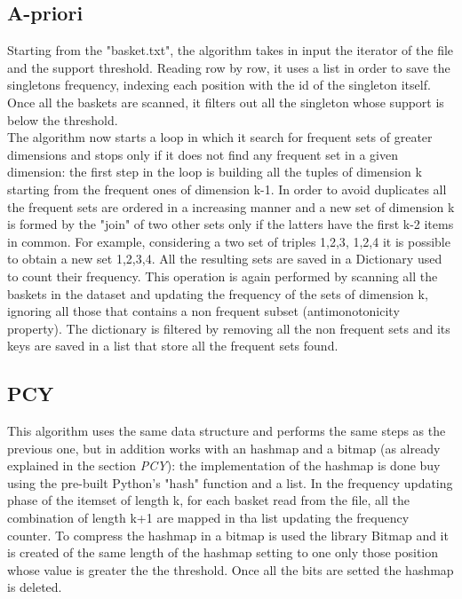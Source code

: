 \documentclass[14pt]{extarticle}
\begin{document}
\subsection{A-priori}
Starting from the "basket.txt", the algorithm takes in input the iterator of the file and the support threshold. Reading row by row, it uses a list in order to save the singletons frequency, indexing each position with the id of the singleton itself. Once all the baskets are scanned, it filters out all the singleton whose support is below the threshold.\\
The algorithm now starts a loop in which it search for frequent sets of greater dimensions and stops only if it does not find any frequent set in a given dimension:
the first step in the loop is building all the tuples of dimension k starting from the frequent ones of dimension k-1. In order to avoid duplicates all the frequent sets are ordered in a increasing manner and a new set of dimension k is formed by the "join" of two other sets only if the latters have the first k-2 items in common.
For example, considering a two set of triples {1,2,3}, {1,2,4} it is possible to obtain a new set {1,2,3,4}.
All the resulting sets are saved in a Dictionary used to count their frequency. This operation is again performed by scanning all the baskets in the dataset and updating the frequency of the sets of dimension k, ignoring all those that contains a non frequent subset (antimonotonicity property). The dictionary is filtered by removing all the non frequent sets and its keys are saved in a list that store all the frequent sets found.
 
\subsection{PCY}
This algorithm uses the same data structure and performs the same steps as the previous one, but in addition works with an hashmap and a bitmap (as already explained in the section {\it PCY}): the implementation of the hashmap is done buy using the pre-built Python's "hash" function and a list. In the frequency updating phase of the itemset of length k, for each basket read from the file, all the combination of length k+1 are mapped in tha list updating the frequency counter.
To compress the hashmap in a bitmap is used the library Bitmap and it is created of the same length of the hashmap setting to one only those position whose value is greater the the threshold. Once all the bits are setted the hashmap is deleted.
\end{document}
